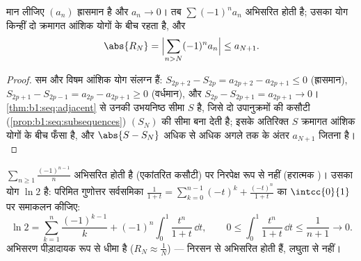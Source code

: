 \begin{theorem}[एकांतरित श्रेणी कसौटी]\label{thm:b1:series:alternating}
मान लीजिए $(a_n)$ ह्रासमान है और $a_n \to 0$। तब  $\sum
(-1)^n a_n$ अभिसरित होती है; उसका योग किन्हीं दो क्रमागत आंशिक योगों के बीच
रहता है, और
\[
\abs{R_N} = \Bigl| \sum_{n > N} (-1)^n a_n \Bigr| \leq a_{N+1} .
\]
\end{theorem}

\begin{proof}
सम और विषम आंशिक योग संलग्न हैं: $S_{2p+2} - S_{2p} = a_{2p+2} - a_{2p+1}
\leq 0$ (ह्रासमान), $S_{2p+1} - S_{2p-1} = a_{2p} - a_{2p+1} \geq 0$
(वर्धमान), और $S_{2p} - S_{2p+1} = a_{2p+1} \to 0$।
\cref{thm:b1:seq:adjacent} से उनकी उभयनिष्ठ सीमा $S$ है, जिसे दो उपानुक्रमों
की कसौटी (\cref{prop:b1:seq:subsequences}) $(S_N)$ की सीमा बना देती है; इसके
अतिरिक्त $S$ क्रमागत आंशिक योगों के बीच फँसा है, और $\abs{S - S_N}$ अधिक से
अधिक अगले तक के अंतर $a_{N+1}$ जितना है।
\end{proof}

\begin{example}[एकांतरित हरात्मक श्रेणी]\label{ex:b1:series:ln2}
$\sum_{n \geq 1} \frac{(-1)^{n-1}}{n}$ अभिसरित होती है (एकांतरित कसौटी) पर
निरपेक्ष रूप से नहीं (हरात्मक )। उसका योग $\ln 2$ है: परिमित गुणोत्तर
सर्वसमिका $\frac{1}{1+t} = \sum_{k=0}^{n-1} (-t)^k + \frac{(-t)^n}{1+t}$ का
$\intcc{0}{1}$ पर समाकलन कीजिए:
\[
\ln 2 = \sum_{k=1}^{n} \frac{(-1)^{k-1}}{k}
+ (-1)^n \int_0^1 \frac{t^n}{1+t}\,\dd t ,
\qquad
0 \leq \int_0^1 \frac{t^n}{1+t}\,\dd t \leq \frac{1}{n+1} \to 0 .
\]
अभिसरण पीड़ादायक रूप से धीमा है ($R_N \approx \frac{1}{N}$) ---  निरसन से अभिसरित होती हैं, लघुता से नहीं।
\end{example}

